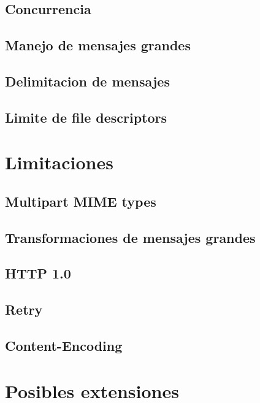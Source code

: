 \documentclass[11pt,a4paper,titlepage]{article}
\begin{document}
    \subsection{Concurrencia}

    \subsection{Manejo de mensajes grandes}

    \subsection{Delimitacion de mensajes}

    \subsection{Limite de file descriptors}

\section{Limitaciones}
    \subsection{Multipart MIME types}

    \subsection{Transformaciones de mensajes grandes}

    \subsection{HTTP 1.0}

    \subsection{Retry}

    \subsection{Content-Encoding}


\section{Posibles extensiones}
\end{document}
